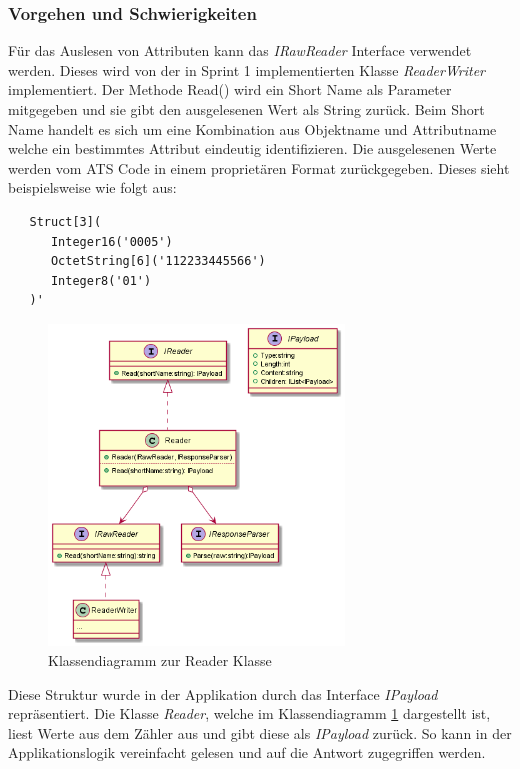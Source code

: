 \subsubsection{Vorgehen und Schwierigkeiten}\label{readAttributVorgehen}
Für das Auslesen von Attributen kann das \textit{IRawReader} Interface verwendet werden.
Dieses wird von der in Sprint 1 implementierten Klasse \textit{ReaderWriter} implementiert.
Der Methode Read() wird ein Short Name als Parameter mitgegeben und sie gibt den ausgelesenen Wert als String zurück.
Beim Short Name handelt es sich um eine Kombination aus Objektname und Attributname welche ein bestimmtes Attribut eindeutig identifizieren.
Die ausgelesenen Werte werden vom \ac{ATS} Code in einem proprietären Format zurückgegeben. 
Dieses sieht beispielsweise wie folgt aus:
\begin{verbatim}
   Struct[3](
      Integer16('0005')
      OctetString[6]('112233445566')
      Integer8('01')
   )'
\end{verbatim}
\begin{figure}
\centering
\includegraphics[width=0.7\textwidth]{gfx/string_toPayload.png}
\caption{
   Klassendiagramm zur Reader Klasse
   }
   \label{fig:reader}
\end{figure}
Diese Struktur wurde in der Applikation durch das Interface \textit{IPayload} repräsentiert.
Die Klasse \textit{Reader}, welche im Klassendiagramm \ref{fig:reader} dargestellt ist, liest Werte aus dem Zähler aus und gibt diese als \textit{IPayload} zurück.
So kann in der Applikationslogik vereinfacht gelesen und auf die Antwort zugegriffen werden.


